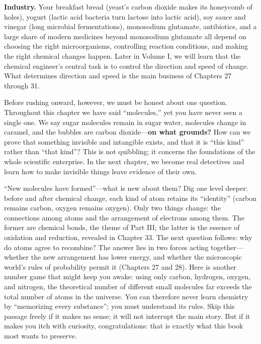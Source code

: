 \textbf{Industry.} Your breakfast bread (yeast's carbon dioxide makes its honeycomb of holes), yogurt (lactic acid bacteria turn lactose into lactic acid), soy sauce and vinegar (long microbial fermentations), monosodium glutamate, antibiotics, and a large share of modern medicines beyond monosodium glutamate all depend on choosing the right microorganisms, controlling reaction conditions, and making the right chemical changes happen. Later in Volume I, we will learn that the chemical engineer's central task is to control the direction and speed of change. What determines direction and speed is the main business of Chapters 27 through 31.

Before rushing onward, however, we must be honest about one question. Throughout this chapter we have said ``molecules,'' yet you have never seen a single one. We say sugar molecules remain in sugar water, molecules change in caramel, and the bubbles are carbon dioxide---\textbf{on what grounds?} How can we prove that something invisible and intangible exists, and that it is ``this kind'' rather than ``that kind''? This is not quibbling; it concerns the foundations of the whole scientific enterprise. In the next chapter, we become real detectives and learn how to make invisible things leave evidence of their own.

\begin{tiaozhan}
``New molecules have formed''---what is new about them? Dig one level deeper: before and after chemical change, each kind of atom retains its ``identity'' (carbon remains carbon, oxygen remains oxygen). Only two things change: the connections among atoms and the arrangement of electrons among them. The former are chemical bonds, the theme of Part III; the latter is the essence of oxidation and reduction, revealed in Chapter 33. The next question follows: why do atoms agree to recombine? The answer lies in two forces acting together---whether the new arrangement has lower energy, and whether the microscopic world's rules of probability permit it (Chapters 27 and 28). Here is another number game that might keep you awake: using only carbon, hydrogen, oxygen, and nitrogen, the theoretical number of different small molecules far exceeds the total number of atoms in the universe. You can therefore never learn chemistry by ``memorizing every substance''; you must understand its rules. Skip this passage freely if it makes no sense; it will not interrupt the main story. But if it makes you itch with curiosity, congratulations: that is exactly what this book most wants to preserve.
\end{tiaozhan}

